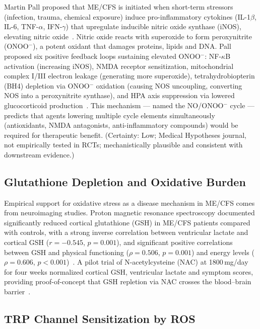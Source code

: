 \begin{speculation}
\label{spec:ch15-noonoo-cycle}
Martin Pall proposed that ME/CFS is initiated when short-term stressors (infection, trauma, chemical exposure) induce pro-inflammatory cytokines (IL-1$\beta$, IL-6, TNF-$\alpha$, IFN-$\gamma$) that upregulate inducible nitric oxide synthase (iNOS), elevating nitric oxide~\cite{Pall2000Peroxynitrite}. Nitric oxide reacts with superoxide to form peroxynitrite (ONOO$^-$), a potent oxidant that damages proteins, lipids and DNA. Pall proposed six positive feedback loops sustaining elevated ONOO$^-$: NF-$\kappa$B activation (increasing iNOS), NMDA receptor sensitization, mitochondrial complex I/III electron leakage (generating more superoxide), tetrahydrobiopterin (BH4) depletion via ONOO$^-$ oxidation (causing NOS uncoupling, converting NOS into a peroxynitrite synthase), and HPA axis suppression via lowered glucocorticoid production~\cite{Pall2001CommonEtiology}. This mechanism --- named the NO/ONOO$^-$ cycle --- predicts that agents lowering multiple cycle elements simultaneously (antioxidants, NMDA antagonists, anti-inflammatory compounds) would be required for therapeutic benefit. (Certainty: Low; Medical Hypotheses journal, not empirically tested in RCTs; mechanistically plausible and consistent with downstream evidence.)
\end{speculation}

\subsection{Glutathione Depletion and Oxidative Burden}

Empirical support for oxidative stress as a disease mechanism in ME/CFS comes from neuroimaging studies. Proton magnetic resonance spectroscopy documented significantly reduced cortical glutathione (GSH) in ME/CFS patients compared with controls, with a strong inverse correlation between ventricular lactate and cortical GSH ($r = -0.545$, $p = 0.001$), and significant positive correlations between GSH and physical functioning ($\rho = 0.506$, $p = 0.001$) and energy levels ($\rho = 0.606$, $p < 0.001$)~\cite{Shungu2012glutathione}. A pilot trial of N-acetylcysteine (NAC) at 1800\,mg/day for four weeks normalized cortical GSH, ventricular lactate and symptom scores, providing proof-of-concept that GSH repletion via NAC crosses the blood--brain barrier~\cite{Shungu2016NACtrial}.

\subsection{TRP Channel Sensitization by ROS}

